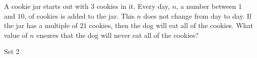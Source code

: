 A cookie jar starts out with $3$ cookies in it. Every day, $n$, a number between $1$ and $10$, of cookies is added to the jar. This $n$ does not change from day to day. If the jar has a multiple of $21$ cookies, then the dog will eat all of the cookies. What value of $n$ ensures that the dog will never eat all of the cookies?





Set 2
